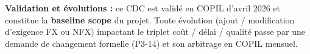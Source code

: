 \documentclass[11pt,a4paper,oneside]{report}
\begin{document}
\begin{reco}
\textbf{Validation et évolutions :} ce CDC est validé en COPIL d'avril 2026 et constitue la \textbf{baseline scope} du projet. Toute évolution (ajout / modification d'exigence FX ou NFX) impactant le triplet coût / délai / qualité passe par une demande de changement formelle (P3-14) et son arbitrage en COPIL mensuel.
\end{reco}
\end{document}
